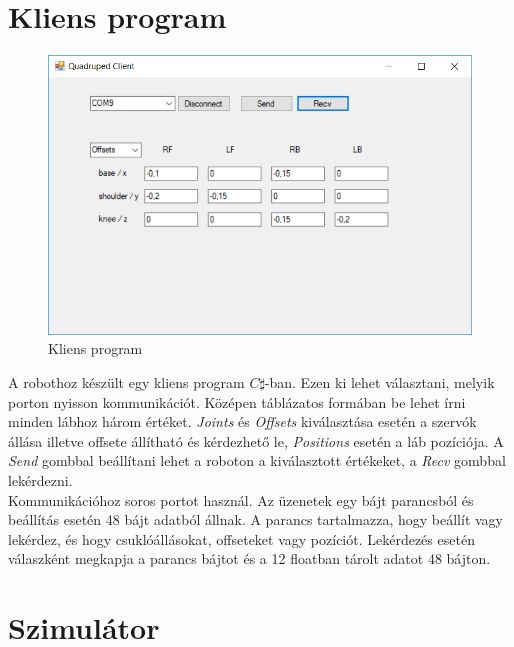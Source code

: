 \documentclass{article}
\begin{document}
\section{Kliens program}
\begin{figure}[h]
	\begin{minipage}{0.9\textwidth}
		\caption{Kliens program}
		\includegraphics[width=\textwidth]{client}
	\end{minipage}
\end{figure}
A robothoz készült egy kliens program $C\sharp$-ban. Ezen ki lehet választani, melyik porton nyisson kommunikációt. Középen táblázatos formában be lehet írni minden lábhoz három értéket. \textit{Joints} és \textit{Offsets} kiválasztása esetén a szervók állása illetve offsete állítható és kérdezhető le, \textit{Positions} esetén a láb pozíciója. A \textit{Send} gombbal beállítani lehet a roboton a kiválasztott értékeket, a \textit{Recv} gombbal lekérdezni.\\ Kommunikációhoz soros portot használ. Az üzenetek egy bájt parancsból és beállítás esetén 48 bájt adatból állnak. A parancs tartalmazza, hogy beállít vagy lekérdez, és hogy csuklóállásokat, offseteket vagy pozíciót. Lekérdezés esetén válaszként megkapja a parancs bájtot és a 12 floatban tárolt adatot 48 bájton.
\section{Szimulátor}
\end{document}
